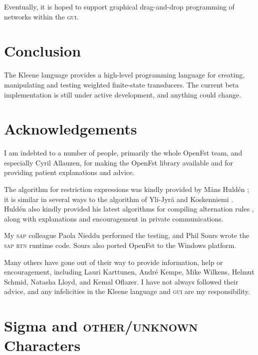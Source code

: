 \documentclass[letterpaper,12pt]{article}
\newcommand{\Kleene}{Kleene\xspace}
\newcommand{\acro}{\textsc}
\begin{document}
\noindent
Eventually, it is hoped to support graphical
drag-and-drop programming of networks within the \acro{gui}.


\section{Conclusion}

The \Kleene{} language provides a high-level programming language for
creating, manipulating and testing weighted finite-state transducers.
The current beta implementation is still under active development, and
anything could change.   

\section{Acknowledgements}

I am indebted to a number of people, primarily the whole OpenFst team,
and especially Cyril Allauzen, for making the OpenFst library
\cite{allauzen+riley+schalkwyk+skut+mohri:2007} available and for
providing patient explanations and advice.

The algorithm for restriction expressions was kindly provided by M\r{a}ns
Huld\'en \cite{hulden:2009fsmnlp,hulden:2009thesis}; it is similar in
several ways to the algorithm of Yli-Jyr\"a and Koskenniemi
\cite{yli-jyra+koskenniemi:2004}.  Huld\'en also kindly provided his
latest algorithms for compiling alternation rules
\cite{hulden:2009thesis}, along with explanations and encouragement in
private communications.

My \acro{sap} colleague Paola Nieddu performed the testing, and Phil
Sours wrote the \acro{sap} \acro{rtn} runtime code.  Sours also
ported OpenFst to the Windows platform.

Many others have gone out of their way to provide information, help or
encouragement, including Lauri Karttunen, Andr\'e Kempe, Mike Wilkens,
Helmut Schmid, Natasha Lloyd, and Kemal Oflazer.  I have not always
followed their advice, and any infelicities in the \Kleene{} language and
\acro{gui} are my responsibility.

\appendix

\newpage

\section{Sigma and \acro{other}/\acro{unknown} Characters}

\label{app:other}
\end{document}
